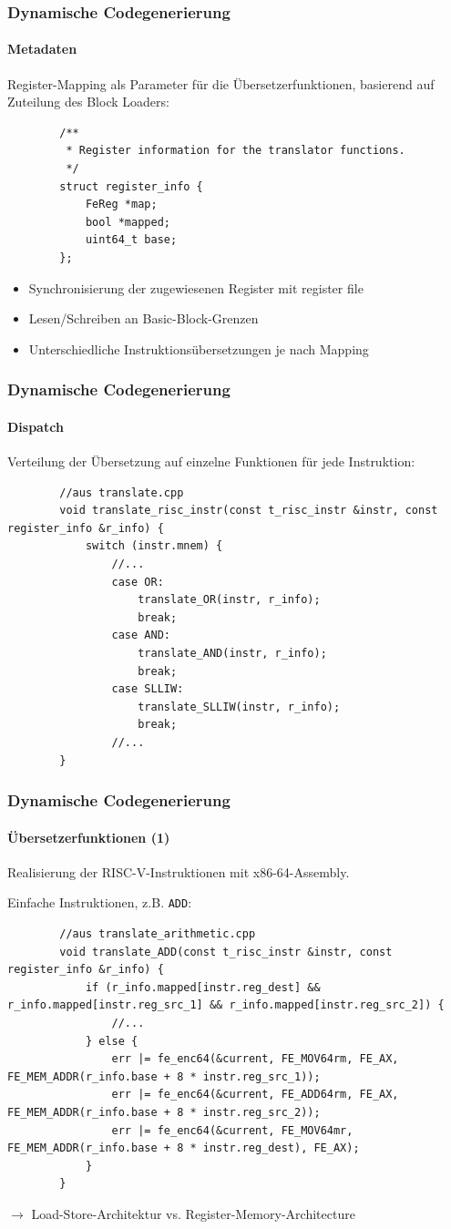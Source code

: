 \documentclass[german]{tum-presentation}
\newcommand{\refer}[0]{\ensuremath{\rightarrow} }
\begin{document}
\begin{frame}[fragile]
	\frametitle{Dynamische Codegenerierung}
	\framesubtitle{Metadaten}
	
	Register-Mapping als Parameter für die Übersetzerfunktionen, basierend auf Zuteilung des Block Loaders:
	\begin{lstlisting}
		/**
		 * Register information for the translator functions.
		 */
		struct register_info {
			FeReg *map;
			bool *mapped;
			uint64_t base;
		};
	\end{lstlisting}
	
	\begin{itemize}
		\item Synchronisierung der zugewiesenen Register mit register file
		\item Lesen/Schreiben an Basic-Block-Grenzen
		\item Unterschiedliche Instruktionsübersetzungen je nach Mapping
	\end{itemize}
\end{frame}

\begin{frame}[fragile]
	\frametitle{Dynamische Codegenerierung}
	\framesubtitle{Dispatch}
	
	Verteilung der Übersetzung auf einzelne Funktionen für jede Instruktion:
	
	\begin{lstlisting}
		//aus translate.cpp
		void translate_risc_instr(const t_risc_instr &instr, const register_info &r_info) {
			switch (instr.mnem) {
				//...
				case OR:
					translate_OR(instr, r_info);
					break;
				case AND:
					translate_AND(instr, r_info);
					break;
				case SLLIW:
					translate_SLLIW(instr, r_info);
					break;
				//...
		}
	\end{lstlisting}
\end{frame}

\begin{frame}[fragile]
	\frametitle{Dynamische Codegenerierung}
	\framesubtitle{Übersetzerfunktionen (1)}
	
	Realisierung der RISC-V-Instruktionen mit x86-64-Assembly.
	
	\pause
	\vspace{0.3cm}
	Einfache Instruktionen, z.B. \verb!ADD!:
	\begin{lstlisting}
		//aus translate_arithmetic.cpp
		void translate_ADD(const t_risc_instr &instr, const register_info &r_info) {
			if (r_info.mapped[instr.reg_dest] && r_info.mapped[instr.reg_src_1] && r_info.mapped[instr.reg_src_2]) {
				//...
			} else {
				err |= fe_enc64(&current, FE_MOV64rm, FE_AX, FE_MEM_ADDR(r_info.base + 8 * instr.reg_src_1));
				err |= fe_enc64(&current, FE_ADD64rm, FE_AX, FE_MEM_ADDR(r_info.base + 8 * instr.reg_src_2));
				err |= fe_enc64(&current, FE_MOV64mr, FE_MEM_ADDR(r_info.base + 8 * instr.reg_dest), FE_AX);
			}
		}
	\end{lstlisting}
	
	\refer Load-Store-Architektur vs. Register-Memory-Architecture
\end{frame}
\end{document}
